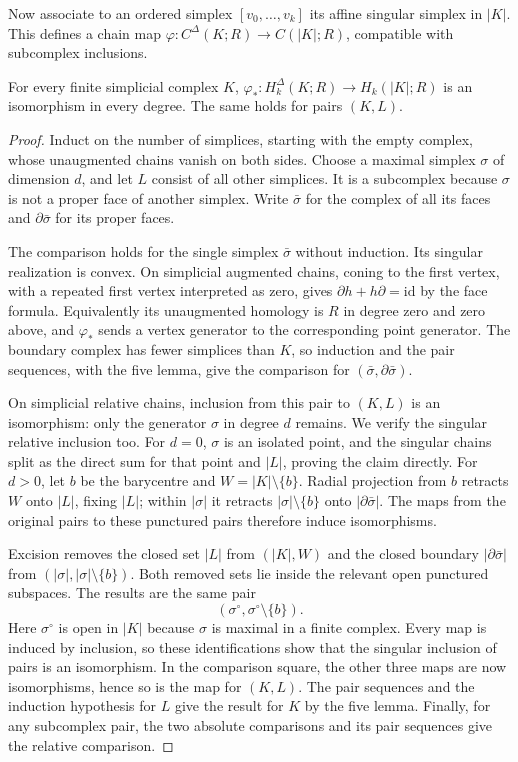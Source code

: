 Now associate to an ordered simplex $[v_0,\ldots,v_k]$ its affine singular simplex in $|K|$. This defines a chain map $\varphi:C^\Delta(K;R)\to C(|K|;R)$, compatible with subcomplex inclusions.

\begin{theorem}\label{thm:simplicialsingular}
For every finite simplicial complex $K$, $\varphi_*:H_k^\Delta(K;R)\to H_k(|K|;R)$ is an isomorphism in every degree. The same holds for pairs $(K,L)$.
\end{theorem}

\begin{proof}
Induct on the number of simplices, starting with the empty complex, whose unaugmented chains vanish on both sides. Choose a maximal simplex $\sigma$ of dimension $d$, and let $L$ consist of all other simplices. It is a subcomplex because $\sigma$ is not a proper face of another simplex. Write $\bar\sigma$ for the complex of all its faces and $\partial\bar\sigma$ for its proper faces.

The comparison holds for the single simplex $\bar\sigma$ without induction. Its singular realization is convex. On simplicial augmented chains, coning to the first vertex, with a repeated first vertex interpreted as zero, gives $\partial h+h\partial=\mathrm{id}$ by the face formula. Equivalently its unaugmented homology is $R$ in degree zero and zero above, and $\varphi_*$ sends a vertex generator to the corresponding point generator. The boundary complex has fewer simplices than $K$, so induction and the pair sequences, with the five lemma, give the comparison for $(\bar\sigma,\partial\bar\sigma)$.

On simplicial relative chains, inclusion from this pair to $(K,L)$ is an isomorphism: only the generator $\sigma$ in degree $d$ remains. We verify the singular relative inclusion too. For $d=0$, $\sigma$ is an isolated point, and the singular chains split as the direct sum for that point and $|L|$, proving the claim directly. For $d>0$, let $b$ be the barycentre and $W=|K|\setminus\{b\}$. Radial projection from $b$ retracts $W$ onto $|L|$, fixing $|L|$; within $|\sigma|$ it retracts $|\sigma|\setminus\{b\}$ onto $|\partial\bar\sigma|$. The maps from the original pairs to these punctured pairs therefore induce isomorphisms.

Excision removes the closed set $|L|$ from $(|K|,W)$ and the closed boundary $|\partial\bar\sigma|$ from $(|\sigma|,|\sigma|\setminus\{b\})$. Both removed sets lie inside the relevant open punctured subspaces. The results are the same pair
\[
(\sigma^\circ,\sigma^\circ\setminus\{b\}).
\]
Here $\sigma^\circ$ is open in $|K|$ because $\sigma$ is maximal in a finite complex. Every map is induced by inclusion, so these identifications show that the singular inclusion of pairs is an isomorphism. In the comparison square, the other three maps are now isomorphisms, hence so is the map for $(K,L)$. The pair sequences and the induction hypothesis for $L$ give the result for $K$ by the five lemma. Finally, for any subcomplex pair, the two absolute comparisons and its pair sequences give the relative comparison.
\end{proof}

